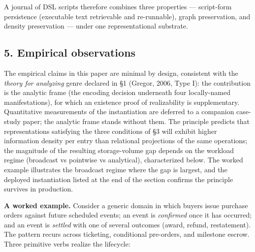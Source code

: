 \documentclass[
]{article}
\begin{document}
A journal of DSL scripts therefore combines three properties ---
script-form persistence (executable text retrievable and re-runnable),
graph preservation, and density preservation --- under one
representational substrate.

\subsection{5. Empirical observations}\label{empirical-observations}

The empirical claims in this paper are minimal by design, consistent
with the \emph{theory for analyzing} genre declared in §1 (Gregor, 2006,
Type I): the contribution is the analytic frame (the encoding decision
underneath four locally-named manifestations), for which an existence
proof of realizability is supplementary. Quantitative measurements of
the instantiation are deferred to a companion case-study paper; the
analytic frame stands without them. The principle predicts that
representations satisfying the three conditions of §3 will exhibit
higher information density per entry than relational projections of the
same operations; the magnitude of the resulting storage-volume gap
depends on the workload regime (broadcast vs pointwise vs analytical),
characterized below. The worked example illustrates the broadcast regime
where the gap is largest, and the deployed instantiation listed at the
end of the section confirms the principle survives in production.

\textbf{A worked example.} Consider a generic domain in which buyers
issue purchase orders against future scheduled events; an event is
\emph{confirmed} once it has occurred; and an event is \emph{settled}
with one of several outcomes (award, refund, restatement). The pattern
recurs across ticketing, conditional pre-orders, and milestone escrow.
Three primitive verbs realize the lifecycle:
\end{document}
